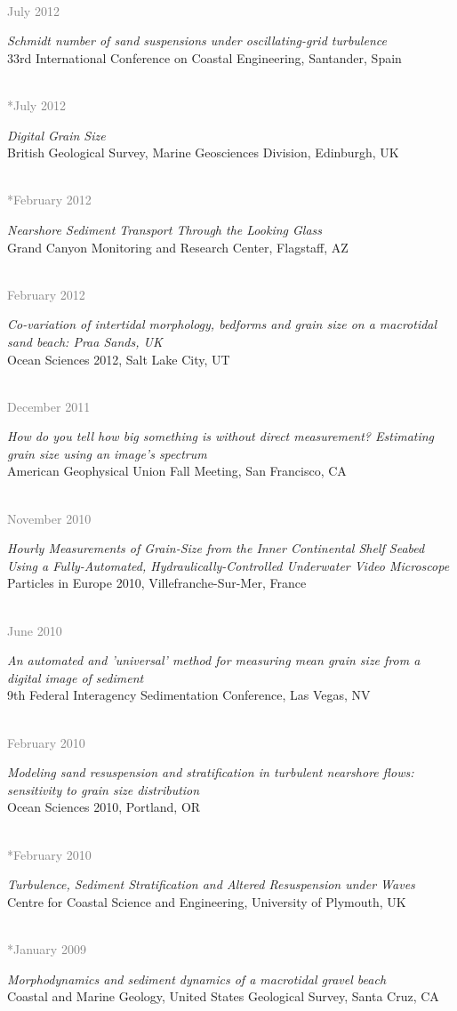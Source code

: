 \documentclass{article} %
\newlength\sidebarwidth
\newcommand{\dateonly}[2][]
	 {\begin{minipage}{\textwidth}
	 \vspace*{.4\baselineskip}
         \nopagebreak\hspace{0in}%
         \nopagebreak\begin{minipage}[t]{\sidebarwidth - .2cm}
         \raggedleft {~}
         {\\[-\baselineskip] \textcolor{gray}{\footnotesize #1}}
	 \end{minipage}%
	 \hfill
	 \begin{minipage}[t]{\linewidth - \sidebarwidth}
	 #2%
	 \end{minipage}%
	 \vspace*{.2\baselineskip plus 1\baselineskip minus
	 .2\baselineskip}%
	 \end{minipage}}
\begin{document}
  \dateonly[July 2012]{
      {\it Schmidt number of sand suspensions under oscillating-grid turbulence}\\
      33rd International Conference on Coastal Engineering, Santander, Spain
  }

  \dateonly[**July 2012]{
      {\it Digital Grain Size}\\
      British Geological Survey, Marine Geosciences Division, Edinburgh, UK
  }

  \dateonly[**February 2012]{
      {\it Nearshore Sediment Transport Through the Looking Glass}\\
      Grand Canyon Monitoring and Research Center, Flagstaff, AZ
  }

  \dateonly[February 2012]{
      {\it Co-variation of intertidal morphology, bedforms and grain size on a macrotidal sand beach: Praa Sands, UK}\\
      Ocean Sciences 2012, Salt Lake City, UT
  }

  \dateonly[December 2011]{
      {\it How do you tell how big something is without direct measurement? Estimating grain size using an image's spectrum}\\
      American Geophysical Union Fall Meeting, San Francisco, CA
  }

  \dateonly[November 2010]{
      {\it Hourly Measurements of Grain-Size from the Inner Continental Shelf Seabed Using a Fully-Automated, Hydraulically-Controlled Underwater Video Microscope}\\
      Particles in Europe 2010, Villefranche-Sur-Mer, France
  }

  \dateonly[June 2010]{
      {\it An automated and 'universal' method for measuring mean grain size from a digital image of sediment}\\
      9th Federal Interagency Sedimentation Conference, Las Vegas, NV
  }

  \dateonly[February 2010]{
      {\it Modeling sand resuspension and stratification in turbulent nearshore flows: sensitivity to grain size distribution}\\
      Ocean Sciences 2010, Portland, OR
    }

  \dateonly[**February 2010]{
      {\it Turbulence, Sediment Stratification and Altered Resuspension under Waves}\\
      Centre for Coastal Science and Engineering, University of Plymouth, UK
    }

  \dateonly[**January 2009]{
    {\it Morphodynamics and sediment dynamics of a macrotidal gravel beach}\\
    Coastal and Marine Geology, United States Geological Survey, Santa Cruz, CA
  }
\end{document}
